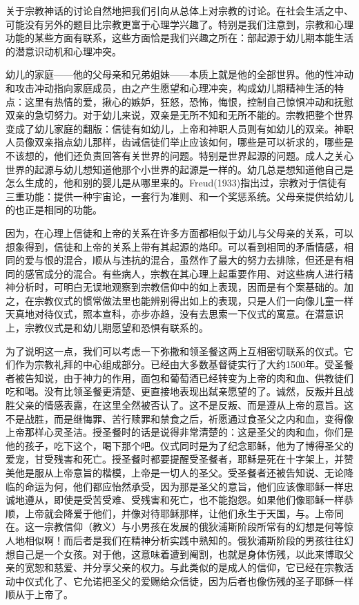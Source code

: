 \documentclass[UTF8,10pt,a4paper,openany]{book}
\begin{document}
关于宗教神话的讨论自然地把我们引向从总体上对宗教的讨论。在社会生活之中、可能没有另外的题目比宗教更富于心理学兴趣了。特别是我们注意到，宗教和心理功能的某些方面有联系，这些方面恰是我们兴趣之所在：部起源于幼儿期本能生活的潜意识动机和心理冲突。

幼儿的家庭——他的父母亲和兄弟姐妹——本质上就是他的全部世界。他的性冲动和攻击冲动指向家庭成员，由之产生愿望和心理冲突，构成幼儿期精神生活的特点：这里有热情的爱，揪心的嫉妒，狂怒，恐怖，悔恨，控制自己惊惧冲动和抚慰双亲的急切努力。对于幼儿来说，双亲是无所不知和无所不能的。宗教把整个世界变成了幼儿家庭的翻版：信徒有如幼儿，上帝和神职人员则有如幼儿的双亲。神职人员像双亲指点幼儿那样，齿诫信徒们举止应该如何，哪些是可以祈求的，哪些是不该想的，他们还负责回答有关世界的问题。特别是世界起源的问题。成人之关心世界的起源与幼儿想知道他那个小世界的起源是一样的。幼几总是想知道他自己是怎么生成的，他和别的婴儿是从哪里来的。Freud(1933)指出过，宗教对于信徒有三重功能：提供一种宇宙论，一套行为准则、和一个奖惩系统。父母亲提供给幼儿的也正是相同的功能。

因为，在心理上信徒和上帝的关系在许多方面都相似于幼儿与父母亲的关系，可以想象得到，信徒和上帝的关系上带有其起源的烙印。可以看到相同的矛盾情感，相同的爱与恨的混合，顺从与违抗的混合，虽然作了最大的努力去排除，但还是有相同的感官成分的混合。有些病人，宗教在其心理上起重要作用、对这些病人进行精神分析时，可明白无误地观察到宗教信仰中的如上表现，因而是有个案基础的。加之，在宗教仪式的惯常做法里也能辨别得出如上的表现，只是人们一向像儿童一样天真地对待仪式，照本宣科，亦步亦趋，没有去思索一下仪式的寓意。在潜意识上，宗教仪式是和幼儿期愿望和恐惧有联系的。

为了说明这一点，我们可以考虑一下弥撒和领圣餐这两上互相密切联系的仪式。它们作为宗教礼拜的中心组成部分。已经由大多数基督徒实行了大约1500年。受圣餐者被告知说，由于神力的作用，面包和葡萄酒已经转变为上帝的肉和血、供教徒们吃和喝。没有比领圣餐更清楚、更直接地表现出弑亲愿望的了。诚然，反叛并且战胜父亲的情感表露，在这里全然被否认了。这不是反叛、而是遵从上帝的意旨。这不是战胜，而是继悔罪、苦行赎罪和禁食之后，祈愿通过食圣父之内和血，变得像上帝那样心灵圣洁。授圣餐时的话是说得非常清楚的：这是圣父的肉和血，你们是他的孩子，吃下这个，喝下那个吧。仪式同时是为了纪念耶稣，他为了博得圣父的爱宠，甘受残害和死亡。授圣餐时都要提醒受圣餐者，耶稣是死在十字架上，并赞美他是服从上帝意旨的楷模，上帝是一切人的圣父。受圣餐者还被告知说、无论降临的命运为何，他们都应怡然承受，因为那是圣父的意旨，他们应该像耶稣一样忠诚地遵从，即使是受苦受难、受残害和死亡，也不能抱怨。如果他们像耶稣一样恭顺，上帝就会降爱于他们，并像对待耶稣那样，让他们永生于天国，与。上帝同在。这一宗教信仰（教义）与小男孩在发展的俄狄浦斯阶段所常有的幻想是何等惊人地相似啊！而后者是我们在精神分析实践中熟知的。俄狄浦斯阶段的男孩往往幻想自己是一个女孩。对于他，这意味着遭到阉割，也就是身体伤残，以此来博取父亲的宽恕和慈爱、并分享父亲的权力。与此类似的是成人的信仰，它已经在宗教活动中仪式化了、它允诺把圣父的爱赐给众信徒，因为后者也像伤残的圣子耶稣一样顺从于上帝了。
\end{document}

